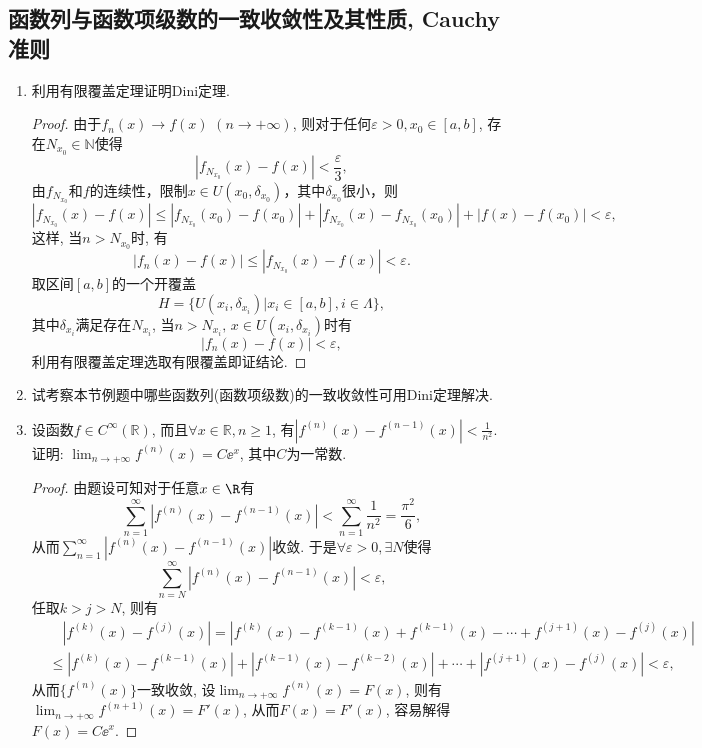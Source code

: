 \subsection{函数列与函数项级数的一致收敛性及其性质, Cauchy准则}
\begin{quiza}
\begin{enumerate}
\item 利用有限覆盖定理证明Dini定理.
\begin{proof}
由于\(f_n(x)\rightarrow f(x)\) \((n\rightarrow+\infty)\), 
则对于任何\(\varepsilon>0,x_0\in [a,b]\), 存在\(N_{x_0}\in\mathbb{N}\)使得
\[\left|f_{N_{x_0}}(x)-f(x)\right|<\frac{\varepsilon}{3},\]
由$f_{N_{x_0}}$和$f$的连续性，限制$x\in U(x_0,\delta_{x_0})$，其中$\delta_{x_0}$很小，则
\[\left|f_{N_{x_0}}(x)-f(x)\right|\leqslant\left|f_{N_{x_0}}(x_0)-f(x_0)\right|
+\left|f_{N_{x_0}}(x)-f_{N_{x_0}}(x_0)\right|+\left|f(x)-f(x_0)\right|<\varepsilon,\]
这样, 当\(n>N_{x_0}\)时, 有
\[\left|f_n(x)-f(x)\right|\leqslant\left|f_{N_{x_0}}(x)-f(x)\right|<\varepsilon.\]
取区间\([a,b]\)的一个开覆盖\[H=\{U(x_i,\delta_{x_i})\big| x_i\in[a,b],i\in\Lambda\},\]
其中\(\delta_{x_i}\)满足存在\(N_{x_i}\), 当\(n>N_{x_i},\, x\in U(x_i,\delta_{x_i})\)时有
\[\left|f_n(x)-f(x)\right|<\varepsilon,\]利用有限覆盖定理选取有限覆盖即证结论.
\end{proof}
\item 试考察本节例题中哪些函数列(函数项级数)的一致收敛性可用Dini定理解决.
\item 设函数\(f\in C^{\infty}(\mathbb{R})\), 
而且\(\forall x\in\mathbb{R},n\geqslant 1\), 
有\(|f^{(n)}(x)-f^{(n-1)}(x)|<\frac{1}{n^2}\). 
证明: \(\lim_{n\rightarrow+\infty}f^{(n)}(x)=C\ee^x\), 其中\(C\)为一常数.
\begin{proof}
由题设可知对于任意\(x\in\R\)有
\[\sum_{n=1}^{\infty}|f^{(n)}(x)-f^{(n-1)}(x)|
<\sum_{n=1}^{\infty}\frac{1}{n^2}=\frac{\pi^2}{6},\]
从而\(\sum_{n=1}^{\infty}|f^{(n)}(x)-f^{(n-1)}(x)|\)收敛. 
于是\(\forall\varepsilon>0,\exists N\)使得
\[\sum_{n=N}^{\infty}|f^{(n)}(x)-f^{(n-1)}(x)|<\varepsilon,\]
任取\(k>j>N\), 则有\[\begin{split}
&\quad|f^{(k)}(x)-f^{(j)}(x)|=|f^{(k)}(x)-f^{(k-1)}(x)+f^{(k-1)}(x)-\cdots+f^{(j+1)}(x)-f^{(j)}(x)|\\
&\leqslant|f^{(k)}(x)-f^{(k-1)}(x)|+|f^{(k-1)}(x)-f^{(k-2)}(x)|+\cdots+|f^{(j+1)}(x)-f^{(j)}(x)|<\varepsilon,
\end{split}\]
从而\(\{f^{(n)}(x)\}\)一致收敛, 设\(\lim_{n\rightarrow+\infty}f^{(n)}(x)=F(x)\), 
则有\(\lim_{n\rightarrow+\infty}f^{(n+1)}(x)=F'(x)\), 从而\(F(x)=F'(x)\), 容易解得\(F(x)=C\ee^x\).

\end{proof}
\end{enumerate}
\end{quiza}
